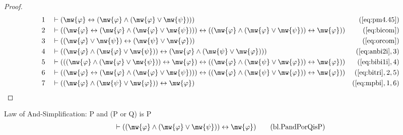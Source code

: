 \begin{proof}
\begin{align}
  1 &&  & \vdash ( \mw{\varphi} \leftrightarrow ( \mw{\varphi} \wedge (
     \mw{\varphi} \vee \mw{\psi} ) )
     )&(\mbox{\ref{eq:pm4.45}})\notag
  \\ 2 &&  & \vdash ( ( \mw{\varphi} \leftrightarrow ( \mw{\varphi} \wedge (
     \mw{\varphi} \vee \mw{\psi} ) ) ) \leftrightarrow ( (
     \mw{\varphi} \wedge ( \mw{\varphi} \vee \mw{\psi} ) )
     \leftrightarrow \mw{\varphi} )
     )&(\mbox{\ref{eq:bicom}})\notag
  \\ 3 &&  & \vdash ( ( \mw{\varphi} \vee \mw{\psi} ) \leftrightarrow (
     \mw{\psi} \vee \mw{\varphi} )
     )&(\mbox{\ref{eq:orcom}})\notag
  \\ 4 &&  & \vdash ( ( \mw{\varphi} \wedge ( \mw{\varphi} \vee \mw{\psi} ) )
     \leftrightarrow ( \mw{\varphi} \wedge ( \mw{\psi}
     \vee \mw{\varphi} ) )
     )&(\mbox{\ref{eq:anbi2i}},3)\notag
  \\ 5 &&  & \vdash ( ( ( \mw{\varphi} \wedge ( \mw{\varphi} \vee \mw{\psi} ) )
     \leftrightarrow \mw{\varphi} ) \leftrightarrow ( (
     \mw{\varphi} \wedge ( \mw{\psi} \vee \mw{\varphi} ) )
     \leftrightarrow \mw{\varphi} )
     )&(\mbox{\ref{eq:bibi1i}},4)\notag
  \\ 6 &&  & \vdash ( ( \mw{\varphi} \leftrightarrow ( \mw{\varphi} \wedge (
     \mw{\varphi} \vee \mw{\psi} ) ) ) \leftrightarrow ( (
     \mw{\varphi} \wedge ( \mw{\psi} \vee \mw{\varphi} ) )
     \leftrightarrow \mw{\varphi} )
     )&(\mbox{\ref{eq:bitri}},2,5)\notag
  \\ 7 &&  & \vdash ( ( \mw{\varphi} \wedge ( \mw{\psi} \vee \mw{\varphi} ) )
     \leftrightarrow \mw{\varphi}
     )&(\mbox{\ref{eq:mpbi}},1,6)\notag
\end{align}
\end{proof}

\begin{lemma} {Law of And-Simplification: P and (P
or Q) is P}
\begin{align}
\vdash ( ( \mw{\varphi} \wedge ( \mw{\varphi} \vee \mw{\psi} ) )
    \leftrightarrow \mw{\varphi} )\label{eq:bl.PandPorQisP}\tag{bl.PandPorQisP}
\end{align}
\end{lemma}


